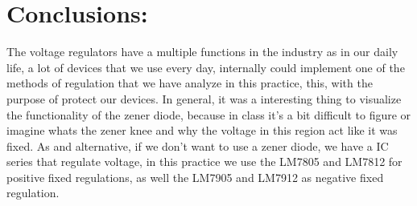 \section{Conclusions:}

The voltage regulators have a multiple functions in the industry as in our daily life, a lot of devices that we use every day, internally could implement one of the methods of regulation that we have analyze in this practice, this, with the purpose of protect our devices. In general, it was a interesting thing to visualize the functionality of the zener diode, because in class it's a bit difficult to figure or imagine whats the zener knee and why the voltage in this region act like it was fixed. As and alternative, if we don't want to use a zener diode, we have a IC series that regulate voltage, in this practice we use the LM7805 and LM7812 for positive fixed regulations, as well the LM7905 and LM7912 as negative fixed regulation. 

\pagebreak